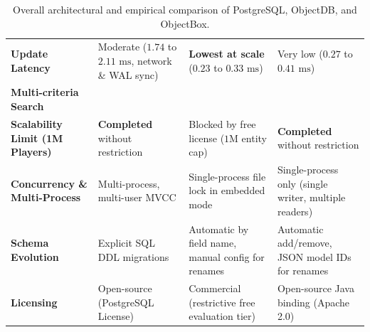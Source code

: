 \documentclass{article}
\begin{document}
\begin{table}[H]
\begin{tabularx}{\textwidth}{>{\RaggedRight\bfseries}p{3.1cm} L L L}
        \addlinespace[4pt]
        \textbf{Update Latency}                 & Moderate ($1.74$ to $2.11\text{ ms}$, network \& WAL sync)                     & \textbf{Lowest at scale} ($0.23$ to $0.33\text{ ms}$)                            & Very low ($0.27$ to $0.41\text{ ms}$)                                             \\
        \addlinespace[4pt]
        \textbf{Multi-criteria Search}          &                                                                                &                                                                                  &                                                                                   \\
        \addlinespace[4pt]
        \textbf{Scalability Limit (1M Players)} & \textbf{Completed} without restriction                                         & Blocked by free license ($1\text{M}$ entity cap)                                 & \textbf{Completed} without restriction                                     \\
        \addlinespace[4pt]
        \textbf{Concurrency \& Multi-Process}   & Multi-process, multi-user MVCC                                                 & Single-process file lock in embedded mode                                        & Single-process only (single writer, multiple readers)                             \\
        \addlinespace[4pt]
        \textbf{Schema Evolution}               & Explicit SQL DDL migrations                                                    & Automatic by field name, manual config for renames                               & Automatic add/remove, JSON model IDs for renames                                  \\
        \addlinespace[4pt]
        \textbf{Licensing}                      & Open-source (PostgreSQL License)                                               & Commercial (restrictive free evaluation tier)                                    & Open-source Java binding (Apache 2.0)                                             \\
        \bottomrule
    \end{tabularx}
    \caption{Overall architectural and empirical comparison of PostgreSQL, ObjectDB, and ObjectBox.}
    \label{tab:overall_comparison}
\end{table}
\end{document}
